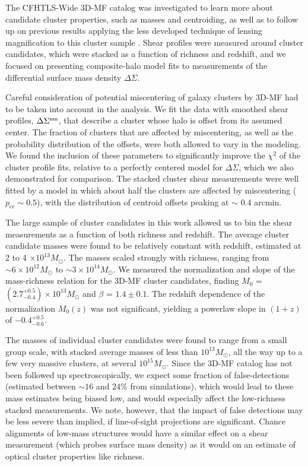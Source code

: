 The \ac{CFHTLS}-Wide \ac{3D-MF} catalog was investigated to learn more about candidate cluster properties, such as masses and centroiding, as well as to follow up on previous results applying the less developed technique of lensing magnification to this cluster sample \citep{Ford14}. Shear profiles were measured around cluster candidates, which were stacked as a function of richness and redshift, and we focused on presenting composite-halo model fits to measurements of the differential surface mass density $\Delta\Sigma$. 

Careful consideration of potential miscentering of galaxy clusters by \ac{3D-MF} had to be taken into account in the analysis. We fit the data with smoothed shear profiles, $\Delta\Sigma^{\rm sm}$, that describe a cluster whose halo is offset from its assumed center. The fraction of clusters that are affected by miscentering, as well as the probability distribution of the offsets, were both allowed to vary in the modeling. We found the inclusion of these parameters to significantly improve the $\chi^2$ of the cluster profile fits, relative to a perfectly centered model for $\Delta\Sigma$, which we also demonstrated for comparison. The stacked cluster shear measurements were well fitted by a model in which about half the clusters are affected by miscentering ($p_{\mathrm{cc}} \sim 0.5$), with the distribution of centroid offsets peaking at $\sim$ 0.4 arcmin.

The large sample of cluster candidates in this work allowed us to bin the shear measurements as a function of both richness and redshift. The average cluster candidate masses were found to be relatively constant with redshift, estimated at 2 to 4 $\times 10^{13} M_{\odot}$. The masses scaled strongly with richness, ranging from $\sim 6 \times 10^{12} M_{\odot}$ to $\sim 3 \times 10^{14} M_{\odot}$. We measured the normalization and slope of the mass-richness relation for the \ac{3D-MF} cluster candidates, finding $M_0$ = $(2.7^{+0.5}_{-0.4}) \times 10^{13} M_{\odot}$ and $\beta$ = $1.4 \pm 0.1$. The redshift dependence of the normalization $M_0 (z)$ was not significant, yielding a powerlaw slope in $(1+z)$ of $-0.4^{+0.5}_{-0.6}$. 

The masses of individual cluster candidates were found to range from a small group scale, with stacked average masses of less than $10^{13} M_{\odot}$, all the way up to a few very massive clusters, at several $10^{15} M_{\odot}$. Since the \ac{3D-MF} catalog has not been followed up spectroscopically, we expect some fraction of false-detections (estimated between $\sim 16$ and $24$\% from simulations), which would lead to these mass estimates being biased low, and would especially affect the low-richness stacked measurements. We note, however, that the impact of false detections may be less severe than implied, if line-of-sight projections are significant. Chance alignments of low-mass structures would have a similar effect on a shear measurement (which probes surface mass density) as it would on an estimate of optical cluster properties like richness.

